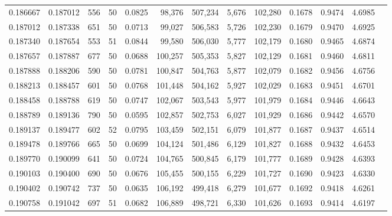 \begin{tabular}{rrrrrrrrrrrrr}
0.186667 & 0.187012 &   556 &  50 &                                     0.0825 &  98,376 & 507,234 &   5,676 & 102,280 & 0.1678 & 0.9474 & 4.6985 \\
0.187012 & 0.187338 &   651 &  50 &                                     0.0713 &  99,027 & 506,583 &   5,726 & 102,230 & 0.1679 & 0.9470 & 4.6925 \\
0.187340 & 0.187654 &   553 &  51 &                                     0.0844 &  99,580 & 506,030 &   5,777 & 102,179 & 0.1680 & 0.9465 & 4.6874 \\
0.187657 & 0.187887 &   677 &  50 &                                     0.0688 & 100,257 & 505,353 &   5,827 & 102,129 & 0.1681 & 0.9460 & 4.6811 \\
0.187888 & 0.188206 &   590 &  50 &                                     0.0781 & 100,847 & 504,763 &   5,877 & 102,079 & 0.1682 & 0.9456 & 4.6756 \\
0.188213 & 0.188457 &   601 &  50 &                                     0.0768 & 101,448 & 504,162 &   5,927 & 102,029 & 0.1683 & 0.9451 & 4.6701 \\
0.188458 & 0.188788 &   619 &  50 &                                     0.0747 & 102,067 & 503,543 &   5,977 & 101,979 & 0.1684 & 0.9446 & 4.6643 \\
0.188789 & 0.189136 &   790 &  50 &                                     0.0595 & 102,857 & 502,753 &   6,027 & 101,929 & 0.1686 & 0.9442 & 4.6570 \\
0.189137 & 0.189477 &   602 &  52 &                                     0.0795 & 103,459 & 502,151 &   6,079 & 101,877 & 0.1687 & 0.9437 & 4.6514 \\
0.189478 & 0.189766 &   665 &  50 &                                     0.0699 & 104,124 & 501,486 &   6,129 & 101,827 & 0.1688 & 0.9432 & 4.6453 \\
0.189770 & 0.190099 &   641 &  50 &                                     0.0724 & 104,765 & 500,845 &   6,179 & 101,777 & 0.1689 & 0.9428 & 4.6393 \\
0.190103 & 0.190400 &   690 &  50 &                                     0.0676 & 105,455 & 500,155 &   6,229 & 101,727 & 0.1690 & 0.9423 & 4.6330 \\
0.190402 & 0.190742 &   737 &  50 &                                     0.0635 & 106,192 & 499,418 &   6,279 & 101,677 & 0.1692 & 0.9418 & 4.6261 \\
0.190758 & 0.191042 &   697 &  51 &                                     0.0682 & 106,889 & 498,721 &   6,330 & 101,626 & 0.1693 & 0.9414 & 4.6197 \\

\end{tabular}
